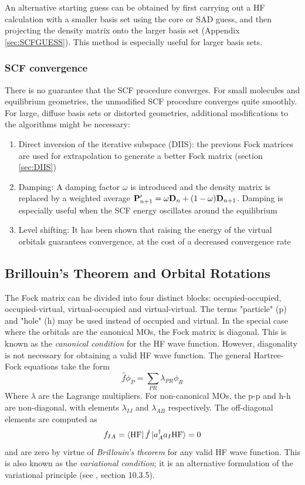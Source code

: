 An alternative starting guess can be obtained by first carrying out a HF calculation with a smaller basis set using the core or SAD guess, and then projecting the density matrix onto the larger basis set (Appendix \ref{sec:SCFGUESS}). This method is especially useful for larger basis sets.  

\subsubsection{SCF convergence}

There is no guarantee that the SCF procedure converges. For small molecules and equilibrium geometries, the unmodified SCF procedure converges quite smoothly. For large, diffuse basis sets or distorted geometries, additional modifications to the algorithms might be necessary:
\begin{enumerate}
\item Direct inversion of the iterative subspace (DIIS): the previous Fock matrices are used for extrapolation to generate a better Fock matrix (section \ref{sec:DIIS})
\item Damping: A damping factor $\omega$ is introduced and the density matrix is replaced by a weighted average $\mathbf{P}'_{n+1} = \omega \mathbf{D}_n + (1-\omega)\mathbf{D}_{n+1}$. Damping is especially useful when the SCF energy oscillates around the equilibrium
\item Level shifting: It has been shown that raising the energy of the virtual orbitals guarantees convergence, at the cost of a decreased convergence rate
\end{enumerate} 

\subsection{Brillouin's Theorem and Orbital Rotations}

The Fock matrix can be divided into four distinct blocks: occupied-occupied, occupied-virtual, virtual-occupied and virtual-virtual. The terms "particle" (p) and "hole" (h) may be used instead of occupied and virtual. In the special case where the orbitals are the canonical MOs, the Fock matrix is diagonal. This is known as the \emph{canonical condition} for the HF wave function. However, diagonality is not necessary for obtaining a valid HF wave function. The general Hartree-Fock equations take the form
\begin{equation}
\hat{f} \phi_P = \sum_{PR} \lambda_{PR} \phi_R
\end{equation}
\noindent Where $\lambda$ are the Lagrange multipliers. For non-canonical MOs, the p-p and h-h are non-diagonal, with elements $\lambda_{IJ}$ and $\lambda_{AB}$ respectively. The off-diagonal elements are computed as
\begin{equation}
f_{IA} = \bra{\smash{\text{HF}}}\hat{f}\ket{\smash{a^{\dagger}_A a_I \text{HF}}} = 0
\end{equation}
\noindent and are zero by virtue of \emph{Brillouin's theorem} for any valid HF wave function. This is also known as the \emph{variational condition}; it is an alternative formulation of the variational principle (see \cite{Hel2000}, section 10.3.5).

